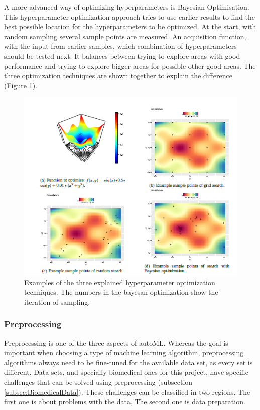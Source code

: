 \documentclass[10pt,a4paper]{article}
\begin{document}
	A more advanced way of optimizing hyperparameters is Bayesian Optimisation. This hyperparameter optimization approach tries to use earlier results to find the best possible location for the hyperparameters to be optimized. At the start, with random sampling several sample points are measured. An acquisition function, with the input from earlier samples, which combination of hyperparameters should be tested next. It balances between trying to explore areas with good performance and trying to explore bigger areas for possible other good areas.\cite{snoek2012practical} The three optimization techniques are shown together to explain the difference (Figure \ref{fig:HyperparameterOptimization}).
	
	\begin{figure}
		\label{fig:HyperparameterOptimization}
		\includegraphics[scale=0.8]{HyperparameterOptimization.png}
		\caption{Examples of the three explained hyperparameter optimization techniques. The numbers in the bayesan optimization show the iteration of sampling.\cite{Gijsbers2017Thesis}}
	\end{figure}
	
	\subsubsection{Preprocessing}
	\label{subsubsec:Preprocessing}
	
 	Preprocessing is one of the three aspects of autoML. Whereas the goal is important when choosing a type of machine learning algorithm, preprocessing algorithms always need to be fine-tuned for the available data set, as every set is different. Data sets, and specially biomedical ones for this project, have specific challenges that can be solved using preprocessing (subsection \ref{subsec:BiomedicalData}). These challenges can be classified in two regions. The first one is about problems with the data, The second one is data preparation.\cite{famili1997data}
 	
\end{document}
